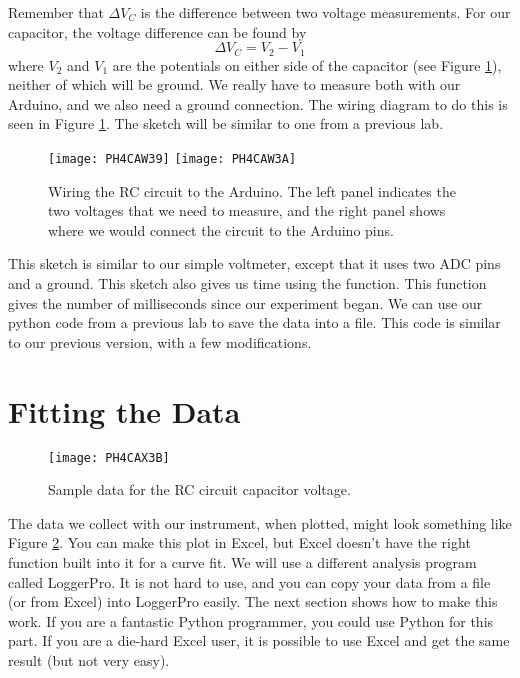 Remember that $\Delta V_{C}$ is the difference between two voltage
measurements. 
For our capacitor, the voltage difference can be found by 
\begin{equation*}
\Delta V_{C}=V_{2}-V_{1}
\end{equation*}%
where $V_2$ and $V_1$ are the potentials on either side of the capacitor
(see Figure \ref{fig:rc_wiring}),
neither of which will be ground. We really have to measure both with our
Arduino, and we also need a ground connection. The wiring diagram to do this
is seen in Figure \ref{fig:rc_wiring}. The sketch will be similar to one from
a previous lab.
\begin{figure}[htbp!]
	\centering
\texttt{[image: PH4CAW39]}
\texttt{[image: PH4CAW3A]}
	\caption[Wiring the RC circuit to the Arduino]{Wiring the RC circuit 
	to the Arduino. The left panel indicates the two voltages that we
	need to measure, and the right panel shows where we would connect
	the circuit to the Arduino pins.}
	\label{fig:rc_wiring}
\end{figure}



This sketch is similar to our simple voltmeter, except that it
uses two ADC pins and a ground. This
sketch also gives us time using the  function. 
This function gives
the number of milliseconds since our experiment began. We can use our python
code from a previous lab to save the data into a file. This code is 
similar to our previous version, with a few modifications.



\section{Fitting the Data}

\begin{figure}[htbp!]
	\centering
\texttt{[image: PH4CAX3B]}
	\caption{Sample data for the RC circuit capacitor voltage.}
	\label{fig:rc_data}
\end{figure}
The data we collect with our instrument, when plotted, might look something 
like Figure \ref{fig:rc_data}.
You can make this plot in Excel, but 
Excel doesn't have the right function built into it for a
curve fit. We will use a different analysis program called LoggerPro. It is not
hard to use, and you can copy your data from a file (or from Excel) into
LoggerPro easily. The next section shows how to make this work. If you are a
fantastic Python programmer, you could use Python for this part. If you are
a die-hard Excel user, it is possible to use Excel and get the same
result (but not very easy). 

